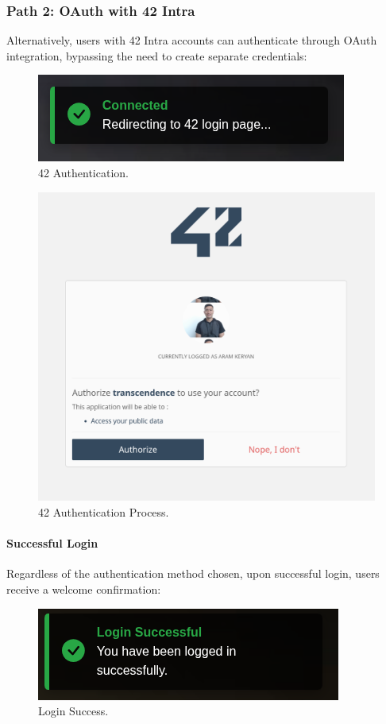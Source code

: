 \subsubsection{Path 2: OAuth with 42 Intra} Alternatively, users with 42 Intra accounts can authenticate through OAuth integration, bypassing the need to create separate credentials:

\begin{figure}[H]
    \centering
    \includegraphics[width=0.6\linewidth]{Figures/images/new_images/42Login.png}
    \caption{42 Authentication.} %
    \label{fig:42-login}
\end{figure}

\begin{figure}[H]
    \centering
    \includegraphics[width=0.6\linewidth]{Figures/images/new_images/42Authentication.png}
    \caption{42 Authentication Process.} %
    \label{fig:42-auth-process}
\end{figure}

\paragraph{Successful Login} Regardless of the authentication method chosen, upon successful login, users receive a welcome confirmation:

\begin{figure}[H]
    \centering
    \includegraphics[width=0.6\linewidth]{Figures/images/new_images/LoginSuccessfully.png}
    \caption{Login Success.} %
    \label{fig:login-success-wireframe}
\end{figure}

